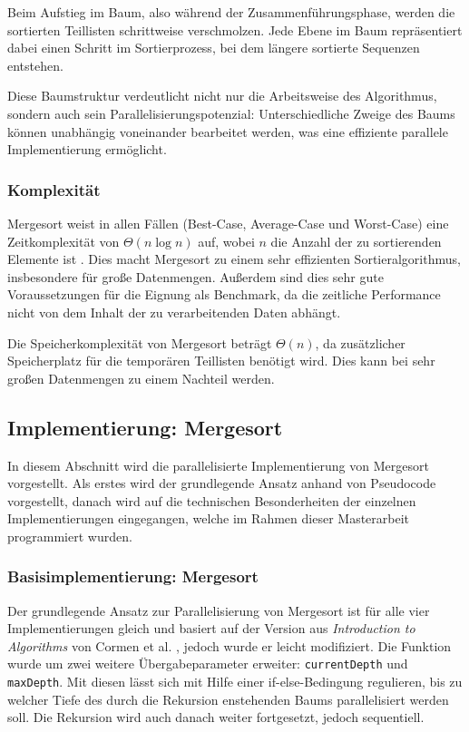 \documentclass[fontsize=12pt,paper=a4,twoside=semi,parskip=half-,headsepline,headinclude]{scrreprt}
\begin{document}
Beim Aufstieg im Baum, also während der Zusammenführungsphase, werden die sortierten Teillisten schrittweise verschmolzen. Jede Ebene im Baum repräsentiert dabei einen Schritt im Sortierprozess, bei dem längere sortierte Sequenzen entstehen.

Diese Baumstruktur verdeutlicht nicht nur die Arbeitsweise des Algorithmus, sondern auch sein Parallelisierungspotenzial: Unterschiedliche Zweige des Baums können unabhängig voneinander bearbeitet werden, was eine effiziente parallele Implementierung ermöglicht.

\subsubsection{Komplexität}

Mergesort weist in allen Fällen (Best-Case, Average-Case und Worst-Case) eine Zeitkomplexität von $\Theta(n \log n)$ auf, wobei $n$ die Anzahl der zu sortierenden Elemente ist \cite{Cormen2022}. Dies macht Mergesort zu einem sehr effizienten Sortieralgorithmus, insbesondere für große Datenmengen. Außerdem sind dies sehr gute Voraussetzungen für die Eignung als Benchmark, da die zeitliche Performance nicht von dem Inhalt der zu verarbeitenden Daten abhängt.

Die Speicherkomplexität von Mergesort beträgt $\Theta(n)$, da zusätzlicher Speicherplatz für die temporären Teillisten benötigt wird. Dies kann bei sehr großen Datenmengen zu einem Nachteil werden.


\subsection{Implementierung: Mergesort}

In diesem Abschnitt wird die parallelisierte Implementierung von Mergesort vorgestellt. Als erstes wird der grundlegende Ansatz anhand von Pseudocode vorgestellt, danach wird auf die technischen Besonderheiten der einzelnen Implementierungen eingegangen, welche im Rahmen dieser Masterarbeit programmiert wurden.

\subsubsection{Basisimplementierung: Mergesort}
\label{subsubsec:implms}

Der grundlegende Ansatz zur Parallelisierung von Mergesort ist für alle vier Implementierungen gleich und basiert auf der Version aus \emph{Introduction to Algorithms} von Cormen et al. \cite[S. 775]{Cormen2022}, jedoch wurde er leicht modifiziert. Die Funktion wurde um zwei weitere Übergabeparameter erweiter: \texttt{currentDepth} und \texttt{maxDepth}. Mit diesen lässt sich mit Hilfe einer if-else-Bedingung regulieren, bis zu welcher Tiefe des durch die Rekursion enstehenden Baums parallelisiert werden soll. Die Rekursion wird auch danach weiter fortgesetzt, jedoch sequentiell.
\end{document}
